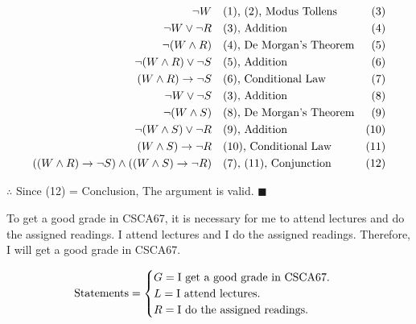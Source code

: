 \documentclass[]{article}
\begin{document}
\begin{center}
     \\
    \\
\end{center}
\begin{align*}
    \neg W \quad & \text{(1), (2), Modus Tollens} \hfill & \text{(3)} \\
    \neg W \lor \neg R \quad & \text{(3), Addition} \hfill & \text{(4)} \\ 
    \neg(W \land R) \quad & \text{(4), De Morgan's Theorem} \hfill & \text{(5)} \\
    \neg(W \land R) \lor \neg S \quad & \text{(5), Addition} \hfill & \text{(6)} \\
    (W \land R) \rightarrow \neg S \quad & \text{(6), Conditional Law} \hfill & \text{(7)} \\
    \neg W \lor \neg S \quad & \text{(3), Addition} \hfill & \text{(8)} \\
    \neg(W \land S) \quad & \text{(8), De Morgan's Theorem} \hfill & \text{(9)} \\
    \neg(W \land S) \lor \neg R \quad & \text{(9), Addition} \hfill & \text{(10)} \\
    (W \land S) \rightarrow \neg R \quad & \text{(10), Conditional Law} \hfill & \text{(11)} \\
    ((W \land R) \rightarrow \neg S) \land ((W \land S) \rightarrow \neg R) \quad & \text{(7), (11), Conjunction} \hfill & \text{(12)} \\
\end{align*}
\begin{center}
    $\therefore$ Since (12) = Conclusion, The argument is valid. $\blacksquare$
\end{center}

\begin{question}
    To get a good grade in CSCA67, it is necessary for me to attend lectures and do the assigned readings. I attend
lectures and I do the assigned readings. Therefore, I will get a good grade in CSCA67.
\end{question}
\[
    \text{Statements} = \begin{cases}
        G = \text{I get a good grade in CSCA67.} \\         
        L = \text{I attend lectures.} \\
        R = \text{I do the assigned readings.}
    \end{cases} \\
\]
    
\end{document}
